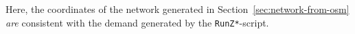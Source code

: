 Here, the coordinates of the network generated in Section~\ref{sec:network-from-osm} \emph{are} consistent with the demand generated by the \lstinline{RunZ*}-script.








